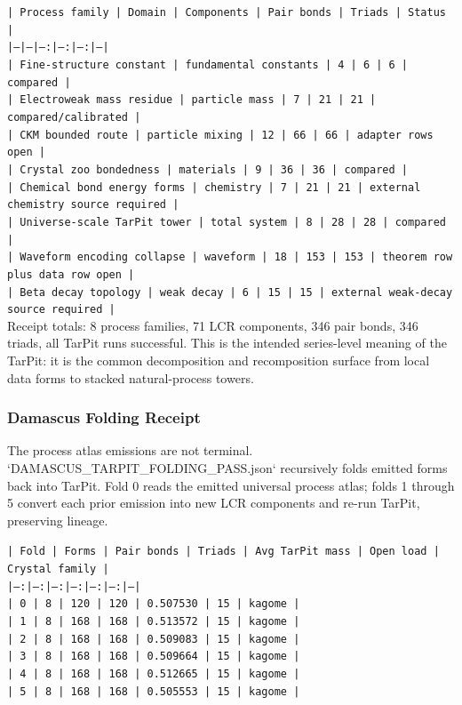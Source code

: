 \documentclass[11pt]{article}
\begin{document}
\noindent\texttt{| Process family | Domain | Components | Pair bonds | Triads | Status |}\\
\noindent\texttt{|---|---|---:|---:|---:|---|}\\
\noindent\texttt{| Fine-structure constant | fundamental constants | 4 | 6 | 6 | compared |}\\
\noindent\texttt{| Electroweak mass residue | particle mass | 7 | 21 | 21 | compared/calibrated |}\\
\noindent\texttt{| CKM bounded route | particle mixing | 12 | 66 | 66 | adapter rows open |}\\
\noindent\texttt{| Crystal zoo bondedness | materials | 9 | 36 | 36 | compared |}\\
\noindent\texttt{| Chemical bond energy forms | chemistry | 7 | 21 | 21 | external chemistry source required |}\\
\noindent\texttt{| Universe-scale TarPit tower | total system | 8 | 28 | 28 | compared |}\\
\noindent\texttt{| Waveform encoding collapse | waveform | 18 | 153 | 153 | theorem row plus data row open |}\\
\noindent\texttt{| Beta decay topology | weak decay | 6 | 15 | 15 | external weak-decay source required |}\\

Receipt totals: 8 process families, 71 LCR components, 346 pair bonds, 346 triads, all TarPit runs successful. This is the intended series-level meaning of the TarPit: it is the common decomposition and recomposition surface from local data forms to stacked natural-process towers.

\subsubsection*{Damascus Folding Receipt}

The process atlas emissions are not terminal. `DAMASCUS\_TARPIT\_FOLDING\_PASS.json` recursively folds emitted forms back into TarPit. Fold 0 reads the emitted universal process atlas; folds 1 through 5 convert each prior emission into new LCR components and re-run TarPit, preserving lineage.

\noindent\texttt{| Fold | Forms | Pair bonds | Triads | Avg TarPit mass | Open load | Crystal family |}\\
\noindent\texttt{|---:|---:|---:|---:|---:|---:|---|}\\
\noindent\texttt{| 0 | 8 | 120 | 120 | 0.507530 | 15 | kagome |}\\
\noindent\texttt{| 1 | 8 | 168 | 168 | 0.513572 | 15 | kagome |}\\
\noindent\texttt{| 2 | 8 | 168 | 168 | 0.509083 | 15 | kagome |}\\
\noindent\texttt{| 3 | 8 | 168 | 168 | 0.509664 | 15 | kagome |}\\
\noindent\texttt{| 4 | 8 | 168 | 168 | 0.512665 | 15 | kagome |}\\
\noindent\texttt{| 5 | 8 | 168 | 168 | 0.505553 | 15 | kagome |}\\
\end{document}
